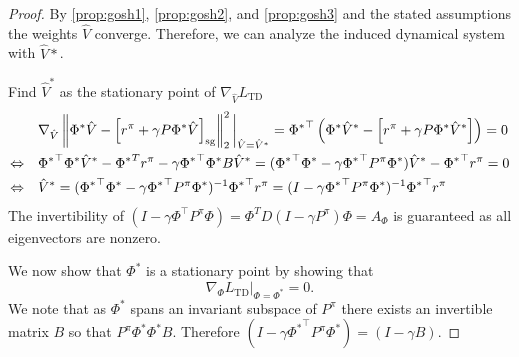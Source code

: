 \begin{proof}
    By \autoref{prop:gosh1}, \autoref{prop:gosh2}, and \autoref{prop:gosh3} and the stated assumptions the weights $\hat{V}$ converge. Therefore, we can analyze the induced dynamical system with $\hat{V}*$.

    Find $\hat{V}^*$ as the stationary point of $\nabla_{\hat{V}} L_\text{TD}$
    \begin{align*}
        & \nabla_{\hat{V}} \left\lVert \Phi^* \hat{V} - \left[r^\pi + \gamma P\Phi^* \hat{V}\right]_\text{sg} \right\rVert_2^2\bigg|_{\hat{V} = \hat{V}^*} = {\Phi^*}^\top\left(\Phi^* \hat{V}^* - \left[r^\pi + \gamma P\Phi^* \hat{V}^*\right]\right) = 0 \\
        \Leftrightarrow \quad & {\Phi^*}^\top \Phi^* \hat{V}^* - {\Phi^*}^T r^\pi - \gamma {\Phi^*}^\top  \Phi^* B \hat{V}^* = ({\Phi^*}^\top \Phi^* - \gamma {\Phi^*}^\top P^\pi \Phi^*) \hat{V}^* - {\Phi^*}^\top r^\pi = 0\\
        \Leftrightarrow \quad & \hat{V}^* = ({\Phi^*}^\top \Phi^* - \gamma {\Phi^*}^\top P^\pi \Phi^*)^{-1} {\Phi^*}^\top r^\pi = (I - \gamma {\Phi^*}^\top P^\pi \Phi^*)^{-1} {\Phi^*}^\top r^\pi
    \end{align*}
    The invertibility of $(I - \gamma \Phi^\top P^\pi \Phi) = \Phi^T D (I - \gamma P^\pi) \Phi = A_\Phi$ is guaranteed as all eigenvectors are nonzero.

    We now show that $\Phi^*$ is a stationary point by showing that $$\nabla_\Phi L_\text{TD}|_{\Phi = \Phi^*} = 0.$$ We note that as $\Phi^*$ spans an invariant subspace of $P^\pi$ there exists an invertible matrix $B$ so that $P^\pi \Phi^*  \Phi^* B$. Therefore $(I - \gamma {\Phi^*}^\top P^\pi \Phi^*) = (I - \gamma B)$.


\end{proof}
